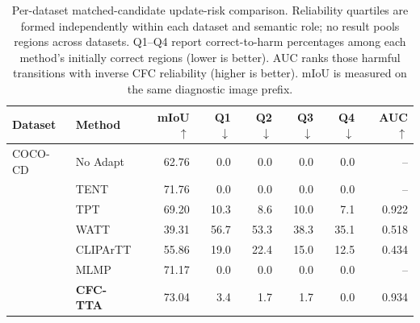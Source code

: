\begin{table}[t]
\centering
\small
\setlength{\tabcolsep}{4.5pt}
\caption{Per-dataset matched-candidate update-risk comparison. Reliability quartiles are formed independently within each dataset and semantic role; no result pools regions across datasets. Q1--Q4 report correct-to-harm percentages among each method's initially correct regions (lower is better). AUC ranks those harmful transitions with inverse CFC reliability (higher is better). mIoU is measured on the same diagnostic image prefix.}
\label{tab:source-risk-per-dataset}
\begin{tabular}{llrrrrrr}
\toprule
Dataset & Method & mIoU $\uparrow$ & Q1 $\downarrow$ & Q2 $\downarrow$ & Q3 $\downarrow$ & Q4 $\downarrow$ & AUC $\uparrow$ \\
\midrule
COCO-CD & No Adapt & 62.76 & 0.0 & 0.0 & 0.0 & 0.0 & -- \\
 & TENT & 71.76 & 0.0 & 0.0 & 0.0 & 0.0 & -- \\
 & TPT & 69.20 & 10.3 & 8.6 & 10.0 & 7.1 & 0.922 \\
 & WATT & 39.31 & 56.7 & 53.3 & 38.3 & 35.1 & 0.518 \\
 & CLIPArTT & 55.86 & 19.0 & 22.4 & 15.0 & 12.5 & 0.434 \\
 & MLMP & 71.17 & 0.0 & 0.0 & 0.0 & 0.0 & -- \\
 & \textbf{CFC-TTA} & 73.04 & 3.4 & 1.7 & 1.7 & 0.0 & 0.934 \\
\bottomrule
\end{tabular}
\end{table}
